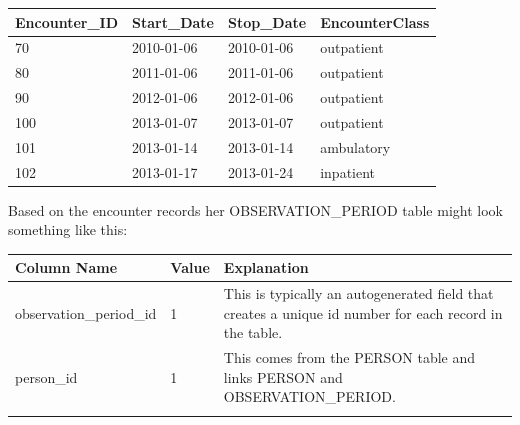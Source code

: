 \documentclass[]{book}
\begin{document}
\begin{longtable}[]{@{}llll@{}}
\toprule
Encounter\_ID & Start\_Date & Stop\_Date & EncounterClass\tabularnewline
\midrule
\endhead
70 & 2010-01-06 & 2010-01-06 & outpatient\tabularnewline
80 & 2011-01-06 & 2011-01-06 & outpatient\tabularnewline
90 & 2012-01-06 & 2012-01-06 & outpatient\tabularnewline
100 & 2013-01-07 & 2013-01-07 & outpatient\tabularnewline
101 & 2013-01-14 & 2013-01-14 & ambulatory\tabularnewline
102 & 2013-01-17 & 2013-01-24 & inpatient\tabularnewline
\bottomrule
\end{longtable}

Based on the encounter records her OBSERVATION\_PERIOD table might look
something like this:

\begin{longtable}[]{@{}lll@{}}
\toprule
\begin{minipage}[b]{0.33\columnwidth}\raggedright\strut
Column Name\strut
\end{minipage} & \begin{minipage}[b]{0.16\columnwidth}\raggedright\strut
Value\strut
\end{minipage} & \begin{minipage}[b]{0.42\columnwidth}\raggedright\strut
Explanation\strut
\end{minipage}\tabularnewline
\midrule
\endhead
\begin{minipage}[t]{0.33\columnwidth}\raggedright\strut
observation\_period\_id\strut
\end{minipage} & \begin{minipage}[t]{0.16\columnwidth}\raggedright\strut
1\strut
\end{minipage} & \begin{minipage}[t]{0.42\columnwidth}\raggedright\strut
This is typically an autogenerated field that creates a unique id number
for each record in the table.\strut
\end{minipage}\tabularnewline
\begin{minipage}[t]{0.33\columnwidth}\raggedright\strut
person\_id\strut
\end{minipage} & \begin{minipage}[t]{0.16\columnwidth}\raggedright\strut
1\strut
\end{minipage} & \begin{minipage}[t]{0.42\columnwidth}\raggedright\strut
This comes from the PERSON table and links PERSON and
OBSERVATION\_PERIOD.\strut
\end{minipage}\tabularnewline
\begin{minipage}[t]{0.33\columnwidth}\raggedright\strut

\end{minipage}
\end{longtable}
\end{document}
